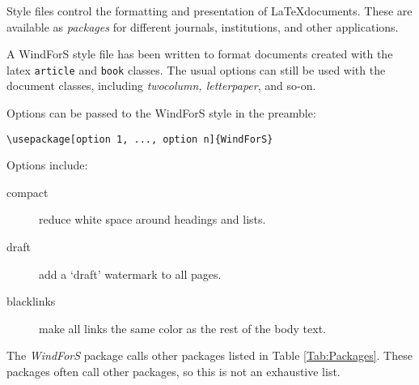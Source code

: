 Style files control the formatting and presentation of \LaTeX documents. These are available as \emph{packages} for different journals, institutions, and other applications. 

A WindForS style file has been written to format documents created with the latex \texttt{article} and \texttt{book} classes. The usual options can still be used with the document classes, including \emph{twocolumn, letterpaper}, and so-on.

Options can be passed to the WindForS style in the preamble:

\begin{lstlisting}
\usepackage[option 1, ..., option n]{WindForS}
\end{lstlisting}

Options include:
\begin{description}
\item[compact]{reduce white space around headings and lists.}
\item[draft]{add a `draft' watermark to all pages.}
\item[blacklinks]{make all links the same color as the rest of the body text.}
\end{description}

The \emph{WindForS} package calls other packages listed in Table \ref{Tab:Packages}. These packages often call other packages, so this is not an exhaustive list.

